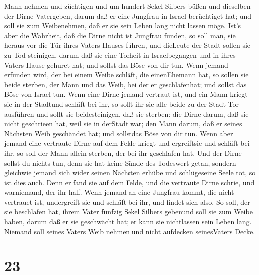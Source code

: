 Mann nehmen und züchtigen  und um hundert Sekel Silbers
büßen und dieselben der Dirne Vatergeben, darum daß er eine Jungfrau in
Israel berüchtiget hat; und soll sie zum Weibenehmen, daß er sie sein
Leben lang nicht lassen möge.  Ist's aber die Wahrheit, daß
die Dirne nicht ist Jungfrau funden,  so soll man, sie
heraus vor die Tür ihres Vaters Hauses führen, und dieLeute der Stadt
sollen sie zu Tod steinigen, darum daß sie eine Torheit in
Israelbegangen und in ihres Vaters Hause gehuret hat; und sollst das
Böse von dir tun.  Wenn jemand erfunden wird, der bei einem
Weibe schläft, die einenEhemann hat, so sollen sie beide sterben, der
Mann und das Weib, bei der er geschlafenhat; und sollst das Böse von
Israel tun.  Wenn eine Dirne jemand vertraut ist, und ein
Mann kriegt sie in der Stadtund schläft bei ihr,  so sollt
ihr sie alle beide zu der Stadt Tor ausführen und sollt sie
beidesteinigen, daß sie sterben: die Dirne darum, daß sie nicht
geschrieen hat, weil sie in derStadt war; den Mann darum, daß er seines
Nächsten Weib geschändet hat; und sollstdas Böse von dir tun.
 Wenn aber jemand eine vertraute Dirne auf dem Felde kriegt
und ergreiftsie und schläft bei ihr, so soll der Mann allein sterben,
der bei ihr geschlafen hat.  Und der Dirne sollst du nichts
tun, denn sie hat keine Sünde des Todeswert getan, sondern gleichwie
jemand sich wider seinen Nächsten erhübe und schlügeseine Seele tot, so
ist dies auch.  Denn er fand sie auf dem Felde, und die
vertraute Dirne schrie, und warniemand, der ihr half.  Wenn
jemand an eine Jungfrau kommt, die nicht vertrauet ist, undergreift sie
und schläft bei ihr, und findet sich also,  So soll, der
sie beschlafen hat, ihrem Vater fünfzig Sekel Silbers gebenund soll sie
zum Weibe haben, darum daß er sie geschwächt hat; er kann sie
nichtlassen sein Leben lang.  Niemand soll seines Vaters
Weib nehmen und nicht aufdecken seinesVaters Decke.

\hypertarget{section-22}{%
\section{23}\label{section-22}}


